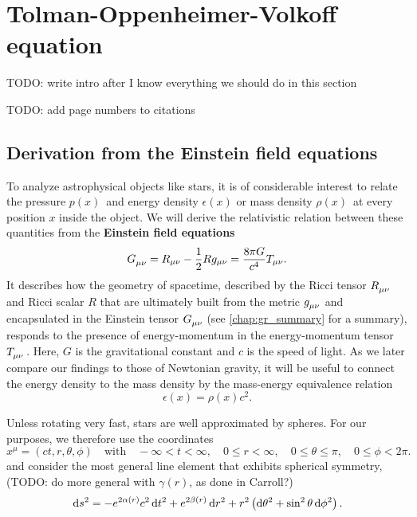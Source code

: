 \chapter{Tolman-Oppenheimer-Volkoff equation}

TODO: write intro after I know everything we should do in this section

TODO: add page numbers to citations

\section{Derivation from the Einstein field equations}
\label{sec:tov}

To analyze astrophysical objects like stars, it is of considerable interest to relate the pressure $p(x)$ and energy density $\epsilon(x)$ or mass density $\rho(x)$ at every position $x$ inside the object.
We will derive the relativistic relation between these quantities from the \textbf{Einstein field equations} \cite[equation 4.44]{ref:carroll}
\begin{equation}
	G\indices{_\mu_\nu} = R_{\mu \nu} - \frac{1}{2} R g_{\mu \nu} = \frac{8 \pi G}{c^4} T_{\mu \nu} .
	\label{eq:einstein}
\end{equation}
It describes how the geometry of spacetime, described by the Ricci tensor $R\indices{_\mu_\nu}$ and Ricci scalar $R$ that are ultimately built from the metric $g\indices{_\mu_\nu}$ and encapsulated in the Einstein tensor $G\indices{_\mu_\nu}$ (see \cref{chap:gr_summary} for a summary), responds to the presence of energy-momentum in the energy-momentum tensor $T\indices{_\mu_\nu}$.
Here, $G$ is the gravitational constant and $c$ is the speed of light.
As we later compare our findings to those of Newtonian gravity, it will be useful to connect the energy density to the mass density by the mass-energy equivalence relation
\begin{equation}
	\epsilon(x) = \rho(x) c^2 .
	\label{eq:tov:mass_energy_equivalence}
\end{equation}

Unless rotating very fast, stars are well approximated by spheres.
For our purposes, we therefore use the coordinates
\begin{equation}
	x^\mu = (c t, r, \theta, \phi)
	\quad \text{with} \quad
	-\infty < t < \infty, \quad
	0 \leq r < \infty, \quad
	0 \leq \theta \leq \pi, \quad
	0 \leq \phi < 2 \pi .
\end{equation}
and consider the most general line element that exhibits spherical symmetry, \cite[§ 94-95]{ref:tolman}
(TODO: do more general with $\gamma(r)$, as done in Carroll?)
\begin{equation}
	\mathop{}\!\mathrm{d} s^2 = -e^{2 \alpha(r)} c^2 \mathop{}\!\mathrm{d} t^2 + e^{2 \beta(r)} \mathop{}\!\mathrm{d} r^2 + r^2 \left( \mathop{}\!\mathrm{d} \theta^2 + \sin^2 \theta \mathop{}\!\mathrm{d} \phi^2 \right) .
\end{equation}

